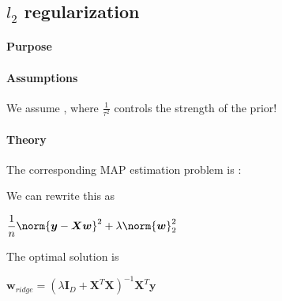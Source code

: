 \subsection{$l_{2}$ regularization}
\paragraph{Purpose}

\paragraph{Assumptions}
We assume , where
$\frac{1}{\tau^{2}}$ controls the strength of the prior! 

\paragraph{Theory}
The corresponding MAP estimation problem is :

\begin{center}
\end{center}
We can rewrite this as 
\begin{center}
    $\dfrac{1}{n}\norm{\bm{y} - \bm{X}\bm{w}}^{2} + \lambda\norm{\bm{w}}^{2}_{2}$
\end{center}
The optimal solution is 
\begin{center}
    $\bm{w}_{ridge} = \left(\lambda\bm{I}_{D} + \bm{X}^{T}\bm{X}\right)^{-1}\bm{X}^{T}
    \bm{y}$
\end{center}


